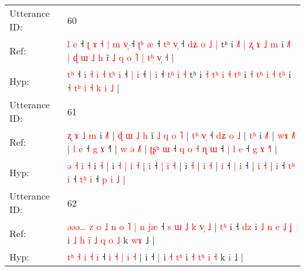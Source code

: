 \documentclass[10pt]{article}
\DeclareRobustCommand{\hl}[1]{{\textcolor{red}{#1}}}
\begin{document}
\begin{longtable}{ll}
 \\
\midrule
Utterance ID: & 60 \\
Ref: & \hl{l}\hl{ }\hl{e} ˧ \hl{ʈ} \hl{ɤ} \hl{˧} \hl{|} \hl{m}\hl{ }\hl{v}\hl{̩} ˧ \hl{ʈ}\hl{ʰ} \hl{æ} ˧ \hl{t}\hl{ʰ} \hl{v}\hl{̩} ˧ \hl{d}\hl{ʑ}\hl{ }\hl{o} \hl{˩} \hl{|} tʰ i \hl{˩}\hl{˥}\hl{ }\hl{|} \hl{ʐ} \hl{ɤ} \hl{˩}\hl{ }\hl{m} i \hl{˩}\hl{˥}\hl{ }\hl{|} \hl{ɖ} \hl{ɯ} \hl{˩}\hl{ }\hl{h} i\hl{̃} \hl{˩} \hl{q}\hl{ }\hl{o} \hl{˥} \hl{|} \hl{t}\hl{ʰ} \hl{v}\hl{̩} \hl{˧} |
 \\
Hyp: & \hl{}\hl{t}\hl{ʰ} ˧ \hl{i} \hl{˧} \hl{i} \hl{˧} \hl{t}\hl{ʰ}\hl{ }\hl{i} ˧ \hl{}\hl{|} \hl{i} ˧ \hl{}\hl{|} \hl{}\hl{i} ˧ \hl{}\hl{}\hl{t}\hl{ʰ} \hl{i} \hl{˧} tʰ i \hl{˧}\hl{ }\hl{t}\hl{ʰ} \hl{i} \hl{˧} \hl{}\hl{t}\hl{ʰ} i \hl{˧}\hl{ }\hl{t}\hl{ʰ} \hl{i} \hl{˧} \hl{}\hl{t}\hl{ʰ} i\hl{} \hl{˧} \hl{}\hl{t}\hl{ʰ} \hl{i} \hl{˧} \hl{}\hl{k} \hl{}\hl{i} \hl{˩} |
 \\
\midrule
Utterance ID: & 61 \\
Ref: & \hl{ʐ} \hl{ɤ} \hl{˩} \hl{m} i \hl{˩}\hl{˥} |\hl{ }\hl{ɖ}\hl{ }\hl{ɯ}\hl{ }\hl{˩}\hl{ }\hl{h} i\hl{̃} \hl{˩} \hl{q} \hl{o} \hl{˥} |\hl{ }\hl{t}\hl{ʰ} \hl{v}\hl{̩} ˧ \hl{d}\hl{ʑ} \hl{o} \hl{˩} |\hl{ }\hl{t}\hl{ʰ} i \hl{˩}\hl{˥} | \hl{w}\hl{ɤ} \hl{˩}\hl{˥} |\hl{ }\hl{l} \hl{e} ˧ \hl{g} \hl{ɤ} ˧\hl{˥} |\hl{ }\hl{w} \hl{ə} \hl{˩}\hl{˥} |\hl{ }\hl{ʈ}\hl{ʂ}\hl{ʰ} \hl{ɯ} ˧\hl{ }\hl{q}\hl{ }\hl{o} \hl{˧}\hl{ }\hl{ɳ} \hl{ɯ} ˧ \hl{|}\hl{ }\hl{l} \hl{e} ˧ \hl{g} \hl{ɤ} \hl{˧}\hl{˥} |
 \\
Hyp: & \hl{ə} \hl{˧} \hl{i} \hl{˧} i \hl{}\hl{˧} |\hl{}\hl{}\hl{}\hl{}\hl{}\hl{}\hl{}\hl{} i\hl{} \hl{˧} \hl{|} \hl{i} \hl{˧} |\hl{}\hl{}\hl{} \hl{}\hl{i} ˧ \hl{}\hl{|} \hl{i} \hl{˧} |\hl{}\hl{}\hl{} i \hl{}\hl{˧} | \hl{}\hl{i} \hl{}\hl{˧} |\hl{}\hl{} \hl{i} ˧ \hl{|} \hl{i} ˧\hl{} |\hl{}\hl{} \hl{i} \hl{}\hl{˧} |\hl{}\hl{}\hl{}\hl{} \hl{i} ˧\hl{}\hl{}\hl{}\hl{} \hl{}\hl{t}\hl{ʰ} \hl{i} ˧ \hl{}\hl{t}\hl{ʰ} \hl{i} ˧ \hl{p} \hl{i} \hl{}\hl{˩} |
 \\
\midrule
Utterance ID: & 62 \\
Ref: & \hl{ə}\hl{ə}\hl{ə}\hl{…}\hl{ }\hl{z}\hl{ }\hl{o}\hl{ }\hl{˩}\hl{ }\hl{n}\hl{ }\hl{o} \hl{˥} \hl{|} \hl{n} \hl{j}\hl{æ} ˧\hl{ }\hl{s} \hl{ɯ} \hl{˩} \hl{k} \hl{v}\hl{̩} \hl{˩} |\hl{ }\hl{t}\hl{ʰ} i ˧ \hl{d}\hl{z} i\hl{ }\hl{˩}\hl{ }\hl{n} \hl{e} \hl{˩}\hl{ }\hl{ʝ} i\hl{ }\hl{˩}\hl{ }\hl{h} \hl{i}\hl{̃} \hl{˩}\hl{ }\hl{q} \hl{o} \hl{˩} k \hl{w}\hl{ɤ} ˩ |
 \\
Hyp: & \hl{}\hl{}\hl{}\hl{}\hl{}\hl{}\hl{}\hl{}\hl{}\hl{}\hl{}\hl{}\hl{t}\hl{ʰ} \hl{˧} \hl{i} \hl{˧} \hl{}\hl{i} ˧\hl{}\hl{} \hl{i} \hl{˧} \hl{|} \hl{}\hl{i} \hl{˧} |\hl{}\hl{}\hl{} i ˧ \hl{}\hl{|} i\hl{}\hl{}\hl{}\hl{} \hl{˧} \hl{}\hl{t}\hl{ʰ} i\hl{}\hl{}\hl{}\hl{} \hl{}\hl{˧} \hl{}\hl{t}\hl{ʰ} \hl{i} \hl{˧} k \hl{}\hl{i} ˩ |

\end{longtable}
\end{document}
